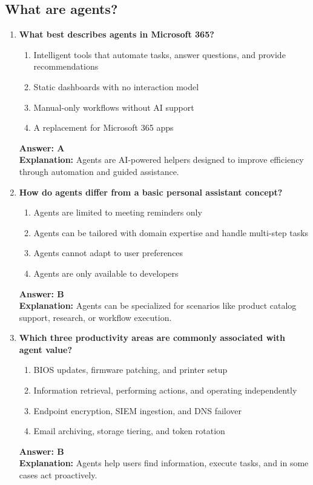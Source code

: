 \documentclass[10pt]{article}
\begin{document}
\clearpage
\subsection{What are agents?}
\begin{enumerate}[leftmargin=*]

\item \textbf{What best describes agents in Microsoft 365?}
\begin{enumerate}[label=\Alph*.]
  \item Intelligent tools that automate tasks, answer questions, and provide recommendations
  \item Static dashboards with no interaction model
  \item Manual-only workflows without AI support
  \item A replacement for Microsoft 365 apps
\end{enumerate}
\textbf{Answer: A}\\
\textbf{Explanation:} Agents are AI-powered helpers designed to improve efficiency through automation and guided assistance.

\item \textbf{How do agents differ from a basic personal assistant concept?}
\begin{enumerate}[label=\Alph*.]
  \item Agents are limited to meeting reminders only
  \item Agents can be tailored with domain expertise and handle multi-step tasks
  \item Agents cannot adapt to user preferences
  \item Agents are only available to developers
\end{enumerate}
\textbf{Answer: B}\\
\textbf{Explanation:} Agents can be specialized for scenarios like product catalog support, research, or workflow execution.

\item \textbf{Which three productivity areas are commonly associated with agent value?}
\begin{enumerate}[label=\Alph*.]
  \item BIOS updates, firmware patching, and printer setup
  \item Information retrieval, performing actions, and operating independently
  \item Endpoint encryption, SIEM ingestion, and DNS failover
  \item Email archiving, storage tiering, and token rotation
\end{enumerate}
\textbf{Answer: B}\\
\textbf{Explanation:} Agents help users find information, execute tasks, and in some cases act proactively.


\end{enumerate}
\end{document}
